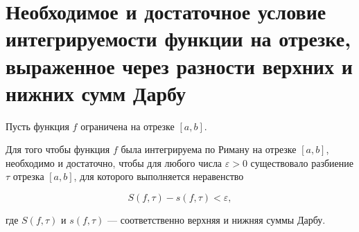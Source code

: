 \documentclass[14pt]{extreport}
\begin{document}
\chapter{Необходимое и достаточное условие интегрируемости функции на отрезке, выраженное через разности верхних и нижних сумм Дарбу}
\begin{theorem}
Пусть функция $f$ ограничена на отрезке $[a,b]$.

Для того чтобы функция $f$ была интегрируема по Риману на отрезке $[a,b]$,
необходимо и достаточно, чтобы для любого числа
$
\varepsilon>0
$
существовало разбиение
$
\tau
$
отрезка $[a,b]$, для которого выполняется неравенство

\[
\boxed{
S(f,\tau)-s(f,\tau)<\varepsilon,
}
\]

где $S(f,\tau)$ и $s(f,\tau)$ --- соответственно верхняя и нижняя суммы Дарбу.
\end{theorem}
\end{document}
